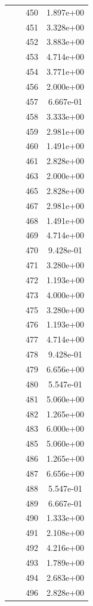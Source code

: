 \documentclass[12pt]{article}
\begin{document}
\begin{longtable}{@{}cccc@{}}
 &  & 450 & 1.897e+00 \\
 &  & 451 & 3.328e+00 \\
 &  & 452 & 3.883e+00 \\
 &  & 453 & 4.714e+00 \\
 &  & 454 & 3.771e+00 \\
 &  & 456 & 2.000e+00 \\
 &  & 457 & 6.667e-01 \\
 &  & 458 & 3.333e+00 \\
 &  & 459 & 2.981e+00 \\
 &  & 460 & 1.491e+00 \\
 &  & 461 & 2.828e+00 \\
 &  & 463 & 2.000e+00 \\
 &  & 465 & 2.828e+00 \\
 &  & 467 & 2.981e+00 \\
 &  & 468 & 1.491e+00 \\
 &  & 469 & 4.714e+00 \\
 &  & 470 & 9.428e-01 \\
 &  & 471 & 3.280e+00 \\
 &  & 472 & 1.193e+00 \\
 &  & 473 & 4.000e+00 \\
 &  & 475 & 3.280e+00 \\
 &  & 476 & 1.193e+00 \\
 &  & 477 & 4.714e+00 \\
 &  & 478 & 9.428e-01 \\
 &  & 479 & 6.656e+00 \\
 &  & 480 & 5.547e-01 \\
 &  & 481 & 5.060e+00 \\
 &  & 482 & 1.265e+00 \\
 &  & 483 & 6.000e+00 \\
 &  & 485 & 5.060e+00 \\
 &  & 486 & 1.265e+00 \\
 &  & 487 & 6.656e+00 \\
 &  & 488 & 5.547e-01 \\
 &  & 489 & 6.667e-01 \\
 &  & 490 & 1.333e+00 \\
 &  & 491 & 2.108e+00 \\
 &  & 492 & 4.216e+00 \\
 &  & 493 & 1.789e+00 \\
 &  & 494 & 2.683e+00 \\
 &  & 496 & 2.828e+00 \\

\end{longtable}
\end{document}
